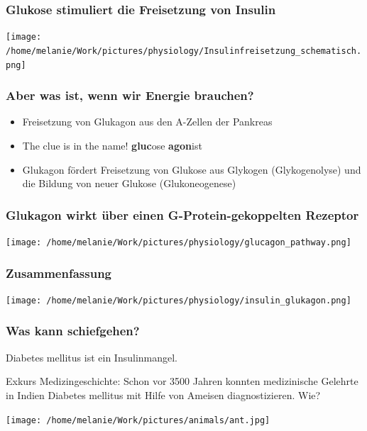 \documentclass{beamer}
\begin{document}
\begin{frame}
\frametitle{Glukose stimuliert die Freisetzung von Insulin}

\begin{center}
\texttt{[image: /home/melanie/Work/pictures/physiology/Insulinfreisetzung\_schematisch.png]}
\end{center}


\end{frame}


\begin{frame}
\frametitle{Aber was ist, wenn wir Energie brauchen?}

\pause

\begin{itemize}
\item
Freisetzung von Glukagon aus den A-Zellen der Pankreas
\item
  The clue is in the name! \textbf{gluc}ose \textbf{agon}ist 
\item
Glukagon fördert Freisetzung von Glukose aus Glykogen (Glykogenolyse) und die Bildung von neuer Glukose (Glukoneogenese)
\end{itemize}
\end{frame}




\begin{frame}
\frametitle{Glukagon wirkt über einen G-Protein-gekoppelten Rezeptor}

\begin{center}
\texttt{[image: /home/melanie/Work/pictures/physiology/glucagon\_pathway.png]}
\end{center}


\end{frame}



\begin{frame}
\frametitle{Zusammenfassung}

\begin{center}
\texttt{[image: /home/melanie/Work/pictures/physiology/insulin\_glukagon.png]}
\end{center}


\end{frame}


\begin{frame}
\frametitle{Was kann schiefgehen?}

Diabetes mellitus ist ein Insulinmangel. 

\pause

Exkurs Medizingeschichte: Schon vor 3500 Jahren konnten medizinische Gelehrte in Indien Diabetes mellitus mit Hilfe von Ameisen diagnostizieren. \pause \textcolor{theme}{Wie?}

\begin{center}
\texttt{[image: /home/melanie/Work/pictures/animals/ant.jpg]}
\end{center}





\end{frame}
\end{document}
